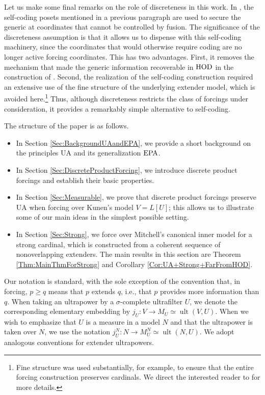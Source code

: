 \documentclass{article}
\theoremstyle{definition}
\theoremstyle{plain}
\DeclareMathOperator{\Ult}{ult}
\begin{document}
Let us make some final remarks on the role of discreteness in this work. In \cite{FriedmanMagidor,aptercummings2023normalmeasuresonlargecards, BenNeriaKaplan}, the self-coding posets mentioned in a previous paragraph are used to secure the generic at coordinates that cannot be controlled by fusion. The significance of the discreteness assumption is that it allows us to dispense with this self-coding machinery, since the coordinates that would otherwise require coding are no longer active forcing coordinates. This has two advantages. First, it removes the mechanism that made the generic information recoverable in ${\rm HOD}$ in the construction of \cite{BenNeriaKaplan}. Second, the realization of the self-coding construction required an extensive use of the fine structure of the underlying extender model, which is avoided here.\footnote{Fine structure was used substantially, for example, to ensure that the entire forcing construction preserves cardinals. We direct the interested reader to \cite{BenNeriaKaplan} for more details.} Thus, although discreteness restricts the class of forcings under consideration, it provides a remarkably simple alternative to self-coding.

The structure of the paper is as follows. 

\begin{itemize}
    \item In Section \ref{Sec:BackgroundUAandEPA}, we provide a short background on the principles {\rm UA} and its generalization ${\rm EPA}$.
    \item In Section \ref{Sec:DiscreteProductForcing}, we introduce discrete product forcings and establish their basic properties.
    \item In Section \ref{Sec:Measurable}, we prove that discrete product forcings preserve {\rm UA} when forcing over Kunen's model $V=L[U]$; this allows us to illustrate some of our main ideas in the simplest possible setting. 
    \item In Section \ref{Sec:Strong}, we force over Mitchell's canonical inner model for a strong cardinal, which is constructed from a coherent sequence of nonoverlapping extenders. The main results in this section are Theorem \ref{Thm:MainThmForStrong} and Corollary \ref{Cor:UA+Strong+FarFromHOD}.
\end{itemize}

Our notation is standard, with the sole exception of the convention that, in forcing, $p\geq q$ means that $p$ extends $q$, i.e., that $p$ provides more information than $q$. When taking an ultrapower by a $\sigma$-complete ultrafilter $U$, we denote the corresponding elementary embedding by 
$j_U\colon V\to M_U\simeq \Ult(V,U)$.
When we wish to emphasize that $U$ is a measure in a model $N$ and that the ultrapower is taken over $N$, we use the notation
$j_U^N\colon N\to M_U^N\simeq \Ult(N,U)$. We adopt analogous conventions for extender ultrapowers.
\end{document}
